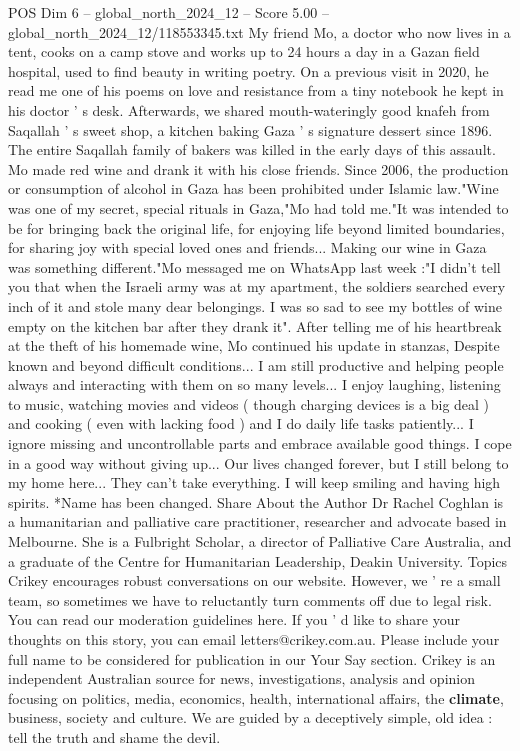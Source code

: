 \begin{textsample}{POS Dim 6 – global\_north\_2024\_12 – Score 5.00 – global\_north\_2024\_12/118553345.txt}
My friend Mo, a doctor who now lives in a tent, cooks on a camp stove and works up to 24 hours a day in a Gazan field hospital, used to find beauty in writing poetry.
On a previous visit in 2020, he read me one of his poems on love and resistance from a tiny notebook he kept in his doctor ' s desk.
Afterwards, we shared mouth-wateringly good knafeh from Saqallah ' s sweet shop, a kitchen baking Gaza ' s signature dessert since 1896.
The entire Saqallah family of bakers was killed in the early days of this assault.
Mo made red wine and drank it with his close friends.
Since 2006, the production or consumption of alcohol in Gaza has been prohibited under Islamic law."Wine was one of my secret, special rituals in Gaza,"Mo had told me."It was intended to be for bringing back the original life, for enjoying life beyond limited boundaries, for sharing joy with special loved ones and friends...
Making our wine in Gaza was something different."Mo messaged me on WhatsApp last week :"I didn't tell you that when the Israeli army was at my apartment, the soldiers searched every inch of it and stole many dear belongings.
I was so sad to see my bottles of wine empty on the kitchen bar after they drank it".
After telling me of his heartbreak at the theft of his homemade wine, Mo continued his update in stanzas, Despite known and beyond difficult conditions...
I am still productive and helping people always and interacting with them on so many levels...
I enjoy laughing, listening to music, watching movies and videos ( though charging devices is a big deal ) and cooking ( even with lacking food ) and I do daily life tasks patiently...
I ignore missing and uncontrollable parts and embrace available good things.
I cope in a good way without giving up...
Our lives changed forever, but I still belong to my home here...
They can't take everything.
I will keep smiling and having high spirits. *Name has been changed.
Share About the Author Dr Rachel Coghlan is a humanitarian and palliative care practitioner, researcher and advocate based in Melbourne.
She is a Fulbright Scholar, a director of Palliative Care Australia, and a graduate of the Centre for Humanitarian Leadership, Deakin University.
Topics Crikey encourages robust conversations on our website.
However, we ' re a small team, so sometimes we have to reluctantly turn comments off due to legal risk.
You can read our moderation guidelines here.
If you ' d like to share your thoughts on this story, you can email letters@crikey.com.au.
Please include your full name to be considered for publication in our Your Say section.
Crikey is an independent Australian source for news, investigations, analysis and opinion focusing on politics, media, economics, health, international affairs, the \textbf{climate}, business, society and culture.
We are guided by a deceptively simple, old idea : tell the truth and shame the devil.

\end{textsample}
